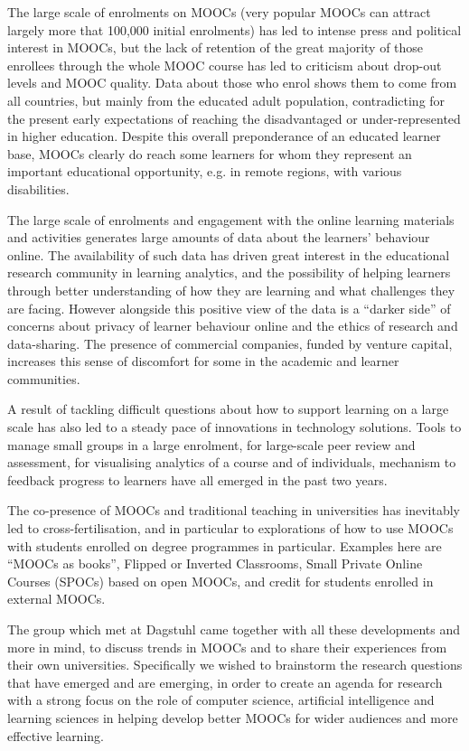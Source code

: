 The large scale of enrolments on MOOCs (very popular MOOCs can attract
largely more that 100,000 initial enrolments) has led to intense press
and political interest in MOOCs, but the lack of retention of the great
majority of those enrollees through the whole MOOC course has led to
criticism about drop-out levels and MOOC quality.  Data about those who
enrol shows them to come from all countries, but mainly from the
educated adult population, contradicting for the present early
expectations of reaching the disadvantaged or under-represented in
higher education.  Despite this overall preponderance of an educated
learner base, MOOCs clearly do reach some learners for whom they
represent an important educational opportunity, e.g. in remote regions,
with various disabilities.

The large scale of enrolments and engagement with the online learning
materials and activities generates large amounts of data about the
learners' behaviour online.  The availability of such data has driven
great interest in the educational research community in learning
analytics, and the possibility of helping learners through better
understanding of how they are learning and what challenges they are
facing.  However alongside this positive view of the data is a ``darker
side'' of concerns about privacy of learner behaviour online and the
ethics of research and data-sharing.  The presence of commercial
companies, funded by venture capital, increases this sense of discomfort
for some in the academic and learner communities.

A result of tackling difficult questions about how to support learning
on a large scale has also led to a steady pace of innovations in
technology solutions.  Tools to manage small groups in a large
enrolment, for large-scale peer review and assessment, for visualising
analytics of a course and of individuals, mechanism to feedback progress
to learners have all emerged in the past two years.

The co-presence of MOOCs and traditional teaching in universities has
inevitably led to cross-fertilisation, and in particular to explorations
of how to use MOOCs with students enrolled on degree programmes in
particular.  Examples here are ``MOOCs as books'', Flipped or Inverted
Classrooms, Small Private Online Courses (SPOCs) based on open MOOCs,
and credit for students enrolled in external MOOCs.

The group which met at Dagstuhl came together with all these
developments and more in mind, to discuss trends in MOOCs and to share
their experiences from their own universities.  Specifically we wished
to brainstorm the research questions that have emerged and are emerging,
in order to create an agenda for research with a strong focus on the
role of computer science, artificial intelligence and learning sciences
in helping develop better MOOCs for wider audiences and more effective
learning.

